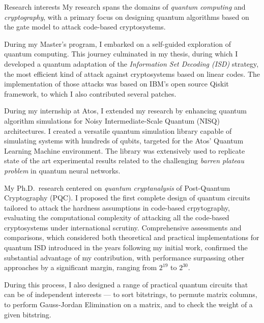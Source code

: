 \documentclass[
	a4paper, %
	11pt, %
]{resume} %
\begin{document}
\begin{rSection}{Research interests}
  My research spans the domains of \emph{quantum computing} and
  \emph{cryptography}, with a primary focus on designing quantum algorithms
  based on the gate model to attack code-based cryptosystems.

  During my Master's program, I embarked on a self-guided exploration of quantum
  computing. This journey culminated in my thesis, during which I developed a
  quantum adaptation of the \emph{Information Set Decoding (ISD)} strategy, the
  most efficient kind of attack against cryptosystems based on linear codes. The
  implementation of those attacks was based on IBM's open source Qiskit
  framework, to which I also contributed several patches.

  During my internship at Atos, I extended my research by enhancing quantum
  algorithm simulations for Noisy Intermediate-Scale Quantum (NISQ)
  architectures. I created a versatile quantum simulation library capable of
  simulating systems with hundreds of qubits, targeted for the Atos' Quantum
  Learning Machine environment. The library was extensively used to replicate
  state of the art experimental results related to the challenging \emph{barren
    plateau problem} in quantum neural networks.

  My Ph.D.\ research centered on \emph{quantum cryptanalysis} of Post-Quantum
  Cryptography (PQC). I proposed the first complete design of quantum circuits
  tailored to attack the hardness assumptions in code-based crpytography,
  evaluating the computational complexity of attacking all the code-based
  cryptosystems under international scrutiny.
  Comprehensive assessments and comparisons, which considered both theoretical
  and practical implementations for quantum ISD introduced in the years
  following my initial work, confirmed the substantial advantage of my
  contribution, with performance surpassing other approaches by a significant
  margin, ranging from $2^{19}$ to $2^{30}$.

  During this process, I also designed a range of practical quantum circuits
  that can be of independent interests --- to sort bitstrings, to permute matrix
  columns, to perform Gauss-Jordan Elimination on a matrix, and to check the
  weight of a given bitstring.

\end{rSection}
\clearpage
\end{document}
